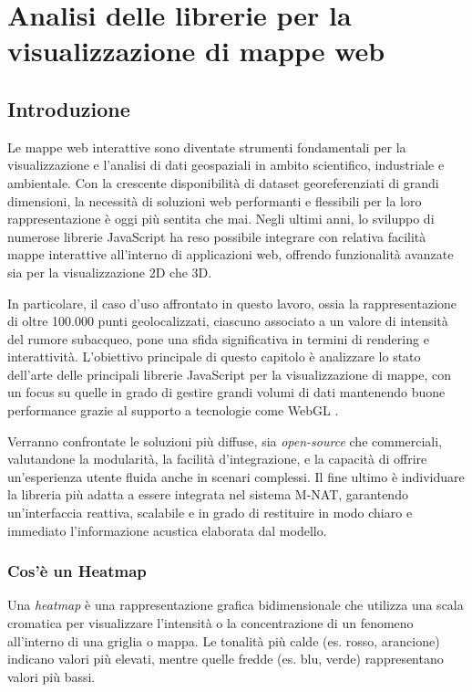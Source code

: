 \chapter{Analisi delle librerie per la visualizzazione di mappe web}

\section{Introduzione}
Le mappe web interattive sono diventate strumenti fondamentali per la visualizzazione e l'analisi di dati geospaziali in ambito scientifico, industriale e ambientale. Con la crescente disponibilità di dataset georeferenziati di grandi dimensioni, la necessità di soluzioni web performanti e flessibili per la loro rappresentazione è oggi più sentita che mai. Negli ultimi anni, lo sviluppo di numerose librerie JavaScript ha reso possibile integrare con relativa facilità mappe interattive all'interno di applicazioni web, offrendo funzionalità avanzate sia per la visualizzazione 2D che 3D.

In particolare, il caso d'uso affrontato in questo lavoro, ossia la rappresentazione di oltre 100.000 punti geolocalizzati, ciascuno associato a un valore di intensità del rumore subacqueo, pone una sfida significativa in termini di rendering e interattività. L'obiettivo principale di questo capitolo è analizzare lo stato dell'arte delle principali librerie JavaScript per la visualizzazione di mappe, con un focus su quelle in grado di gestire grandi volumi di dati mantenendo buone performance grazie al supporto a tecnologie come WebGL \cite{mapbox-gl-js}.

Verranno confrontate le soluzioni più diffuse, sia \textit{open-source} che commerciali, valutandone la modularità, la facilità d'integrazione, e la capacità di offrire un'esperienza utente fluida anche in scenari complessi. Il fine ultimo è individuare la libreria più adatta a essere integrata nel sistema M-NAT, garantendo un'interfaccia reattiva, scalabile e in grado di restituire in modo chiaro e immediato l'informazione acustica elaborata dal modello.

\subsection{Cos'è un Heatmap}
Una \emph{heatmap} è una rappresentazione grafica bidimensionale che utilizza una scala cromatica per visualizzare l'intensità o la concentrazione di un fenomeno all'interno di una griglia o mappa. Le tonalità più calde (es. rosso, arancione) indicano valori più elevati, mentre quelle fredde (es. blu, verde) rappresentano valori più bassi.

